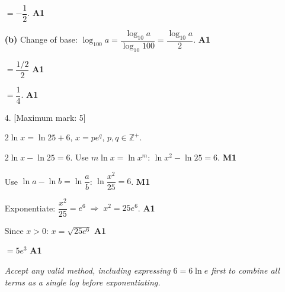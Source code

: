 \documentclass[12pt, twoside]{article}
\begin{document}
\begin{enumerate}[itemsep=0.3cm]
$= -\dfrac{1}{2}$. \hfill \textbf{A1}

\medskip

\textbf{(b)} Change of base:
$\log_{100} a = \dfrac{\log_{10} a}{\log_{10} 100} = \dfrac{\log_{10} a}{2}$.
\hfill \textbf{A1}

$= \dfrac{1/2}{2}$ \hfill \textbf{A1}

$= \dfrac{1}{4}$. \hfill \textbf{A1}

\medskip

\item[4.] [Maximum mark: 5]

$2\ln x = \ln 25 + 6$, $x = p e^{q}$, $p, q \in \mathbb{Z}^{+}$.

\medskip

$2\ln x - \ln 25 = 6$. \;Use $m\ln x = \ln x^{m}$:
$\ln x^{2} - \ln 25 = 6$. \hfill \textbf{M1}

Use $\ln a - \ln b = \ln\dfrac{a}{b}$:
$\ln\dfrac{x^{2}}{25} = 6$. \hfill \textbf{M1}

Exponentiate:
$\dfrac{x^{2}}{25} = e^{6} \;\Rightarrow\; x^{2} = 25 e^{6}$.
\hfill \textbf{A1}

Since $x > 0$: $x = \sqrt{25 e^{6}}$ \hfill \textbf{A1}

$ = 5 e^{3}$ \hfill \textbf{A1}

\emph{Accept any valid method, including expressing $6 = 6\ln e$ first
to combine all terms as a single log before exponentiating.}

\end{enumerate}
\end{document}
